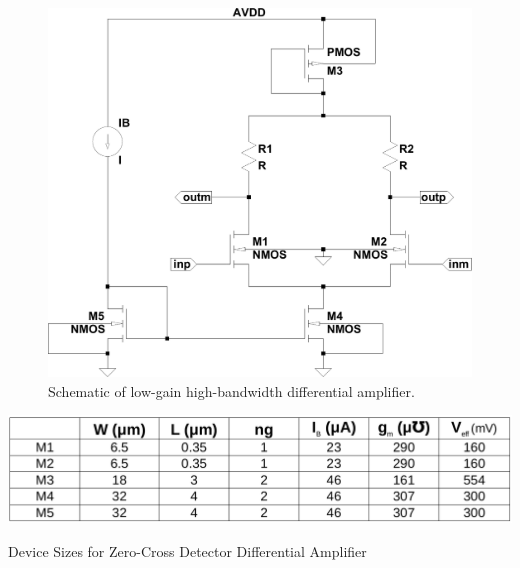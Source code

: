 \documentclass[12pt,oneside,final]{siuethesis}
\theoremstyle{definition}
\begin{document}
\begin{figure}[htbp!]
	\centering
 	\includegraphics[scale=0.5,keepaspectratio=true]{../Design_Reports/CFD_circuit_report/images/zc_dm_amp.pdf}
 	\caption{Schematic of low-gain high-bandwidth differential amplifier.}
 	\label{fig:zcdiffamp}
\end{figure}

\begin{table}[htbp!]
 \centering
 \includegraphics[scale=.35,keepaspectratio=true]{./ch3_figures/zc_sizes.png}
 \caption{Device Sizes for Zero-Cross Detector Differential Amplifier}
 \label{tab:zcdiffamp}
\end{table}
\end{document}
